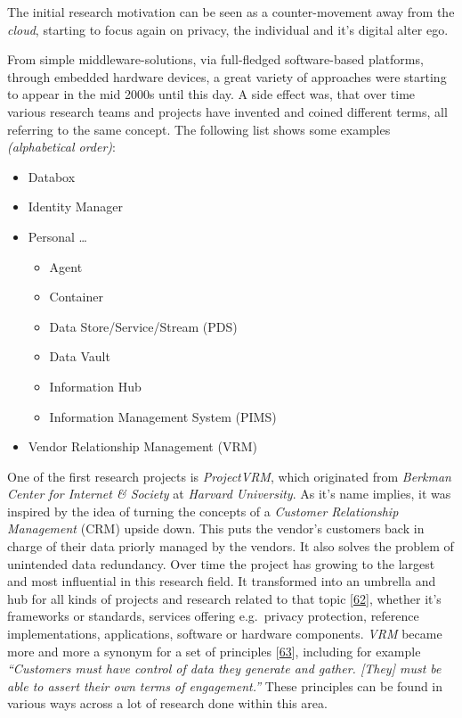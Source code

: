 \documentclass[12pt,english,a4paper,titlepage,cleardoublepage=empty,dottedtoc]{report}
\providecommand{\tightlist}{%
  \setlength{\itemsep}{0pt}\setlength{\parskip}{0pt}}
\begin{document}
The initial research motivation can be seen as a counter-movement away
from the \emph{cloud}, starting to focus again on privacy, the
individual and it's digital alter ego.

From simple middleware-solutions, via full-fledged software-based
platforms, through embedded hardware devices, a great variety of
approaches were starting to appear in the mid 2000s until this day. A
side effect was, that over time various research teams and projects have
invented and coined different terms, all referring to the same concept.
The following list shows some examples \emph{(alphabetical order)}:

\begin{itemize}
\tightlist
\item
  Databox
\item
  Identity Manager
\item
  Personal \ldots{}

  \begin{itemize}
  \tightlist
  \item
    Agent
  \item
    Container
  \item
    Data Store/Service/Stream (PDS)
  \item
    Data Vault
  \item
    Information Hub
  \item
    Information Management System (PIMS)
  \end{itemize}
\item
  Vendor Relationship Management (VRM)
\end{itemize}

One of the first research projects is \emph{ProjectVRM}, which
originated from \emph{Berkman Center for Internet \& Society} at
\emph{Harvard University}. As it's name implies, it was inspired by the
idea of turning the concepts of a \emph{Customer Relationship
Management} (CRM) upside down. This puts the vendor's customers back in
charge of their data priorly managed by the vendors. It also solves the
problem of unintended data redundancy. Over time the project has growing
to the largest and most influential in this research field. It
transformed into an umbrella and hub for all kinds of projects and
research related to that topic
{[}\protect\hyperlink{ref-web_2016_projectvrm_development-work}{62}{]},
whether it's frameworks or standards, services offering e.g.~privacy
protection, reference implementations, applications, software or
hardware components. \emph{VRM} became more and more a synonym for a set
of principles
{[}\protect\hyperlink{ref-web_2016_projectvrm_principles}{63}{]},
including for example \emph{``Customers must have control of data they
generate and gather. {[}They{]} must be able to assert their own terms
of engagement.''} These principles can be found in various ways across a
lot of research done within this area.
\end{document}
